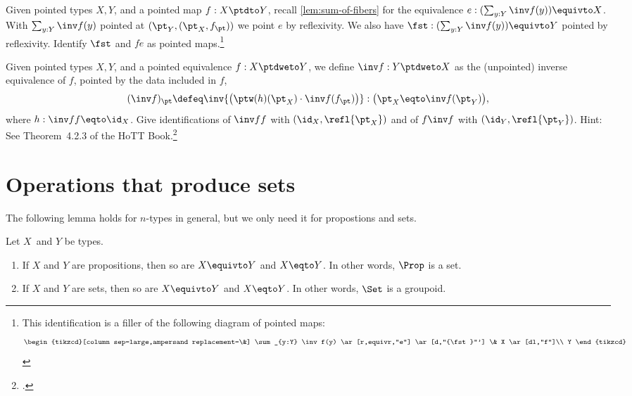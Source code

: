 \begin{xca}\label{xca:filler-ptd-sum-of-fibers}
Given pointed types $X,Y$, and a pointed map $f: X \ptdto Y$,
recall \cref{lem:sum-of-fibers} for the equivalence
$e: (\sum_{y:Y} \inv f(y)) \equivto X$. With $\sum_{y:Y} \inv f(y)$
pointed at $(\pt_Y,(\pt_X,f_\pt))$ we point $e$ by reflexivity.
We also have $\fst: (\sum_{y:Y} \inv f(y)) \equivto Y$ pointed
by reflexivity. Identify $\fst$ and $fe$ as pointed maps.\footnote{%
This identification is a filler of the following diagram
of pointed maps: %
\[\begin{tikzcd}[column sep=large,ampersand replacement=\&]
    \sum_{y:Y} \inv f(y) \ar[r,equivr,"e"] \ar[d,"{\fst}"'] \& 
    X \ar[dl,"f"]\\
    Y 
  \end{tikzcd}
\]}
\end{xca}

\begin{xca}\label{xca:ptd-equiv-inv}
Given pointed types $X,Y$, and a pointed equivalence
$f: X \ptdweto Y$, we define $\inv f: Y \ptdweto X$
as the (unpointed) inverse equivalence of $f$, pointed
by the data included in $f$, \ie
\[
(\inv f)_\pt \defeq \inv{\bigl(\ptw(h)(\pt_X)\cdot\inv f(f_\pt)\bigr)} :
 \bigl(\pt_X\eqto\inv f(\pt_Y)\bigr),
\]
where $h: \inv f f \eqto \id_X$.
Give identifications of $\inv f f$ with $(\id_X,\refl{\pt_X})$ and of
$f\inv f$ with $(\id_Y,\refl{\pt_Y})$.
Hint: See Theorem~4.2.3 of the HoTT Book.\footcite{hottbook}
\end{xca}

\section{Operations that produce sets}
 \label{sec:operations-on-sets}


The following lemma holds for $n$-types in general,
but we only need it for propostions and sets.

\begin{lemma}\label{lem:Set-is-groupoid}
Let $X$ and $Y$ be types.
\begin{enumerate}
\item
If $X$ and $Y$ are propositions, then so are $X \equivto Y$ and $X \eqto Y$.
In other words, $\Prop$ is a set.
\item
If $X$ and $Y$ are sets, then so are $X \equivto Y$ and $X \eqto Y$.
In other words, $\Set$ is a groupoid.
\end{enumerate}
\end{lemma}


